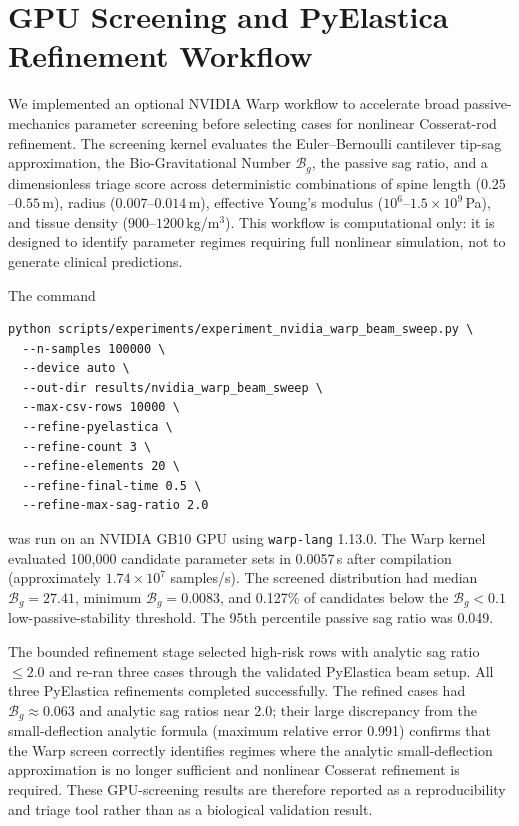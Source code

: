 \section{GPU Screening and PyElastica Refinement Workflow}

We implemented an optional NVIDIA Warp workflow to accelerate broad passive-mechanics parameter screening before selecting cases for nonlinear Cosserat-rod refinement. The screening kernel evaluates the Euler--Bernoulli cantilever tip-sag approximation, the Bio-Gravitational Number $\mathcal{B}_g$, the passive sag ratio, and a dimensionless triage score across deterministic combinations of spine length ($0.25$--$0.55$\,m), radius ($0.007$--$0.014$\,m), effective Young's modulus ($10^6$--$1.5\times10^9$\,Pa), and tissue density ($900$--$1200$\,kg/m$^3$). This workflow is computational only: it is designed to identify parameter regimes requiring full nonlinear simulation, not to generate clinical predictions.

The command
\begin{verbatim}
python scripts/experiments/experiment_nvidia_warp_beam_sweep.py \
  --n-samples 100000 \
  --device auto \
  --out-dir results/nvidia_warp_beam_sweep \
  --max-csv-rows 10000 \
  --refine-pyelastica \
  --refine-count 3 \
  --refine-elements 20 \
  --refine-final-time 0.5 \
  --refine-max-sag-ratio 2.0
\end{verbatim}
was run on an NVIDIA GB10 GPU using \texttt{warp-lang} 1.13.0. The Warp kernel evaluated 100,000 candidate parameter sets in 0.0057\,s after compilation (approximately $1.74\times10^7$ samples/s). The screened distribution had median $\mathcal{B}_g = 27.41$, minimum $\mathcal{B}_g = 0.0083$, and 0.127\% of candidates below the $\mathcal{B}_g < 0.1$ low-passive-stability threshold. The 95th percentile passive sag ratio was 0.049.

The bounded refinement stage selected high-risk rows with analytic sag ratio $\leq 2.0$ and re-ran three cases through the validated PyElastica beam setup. All three PyElastica refinements completed successfully. The refined cases had $\mathcal{B}_g \approx 0.063$ and analytic sag ratios near 2.0; their large discrepancy from the small-deflection analytic formula (maximum relative error 0.991) confirms that the Warp screen correctly identifies regimes where the analytic small-deflection approximation is no longer sufficient and nonlinear Cosserat refinement is required. These GPU-screening results are therefore reported as a reproducibility and triage tool rather than as a biological validation result.

